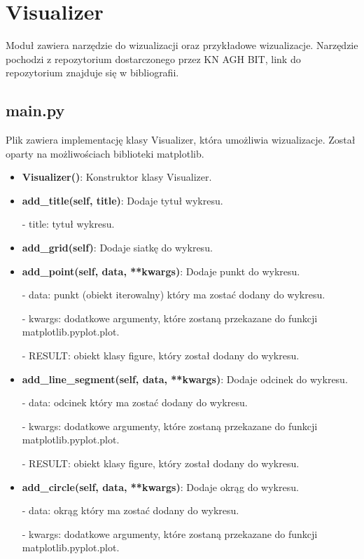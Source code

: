 \documentclass{lab}
\begin{document}
\section{Visualizer}
Moduł zawiera narzędzie do wizualizacji oraz przykładowe wizualizacje.
Narzędzie pochodzi z repozytorium dostarczonego przez KN AGH BIT, link do repozytorium znajduje się w bibliografii.
\subsection{main.py}
Plik zawiera implementację klasy Visualizer, która umożliwia wizualizacje. Został oparty na możliwościach biblioteki matplotlib.
\begin{itemize}
  \item \textbf{Visualizer()}:
  Konstruktor klasy Visualizer.

  \item \textbf{add\_title(self, title)}:
  Dodaje tytuł wykresu.

  - title: tytuł wykresu.

  \item \textbf{add\_grid(self)}:
  Dodaje siatkę do wykresu.

  \item \textbf{add\_point(self, data, **kwargs)}:
  Dodaje punkt do wykresu.

  - data: punkt (obiekt iterowalny) który ma zostać dodany do wykresu.

  - kwargs: dodatkowe argumenty, które zostaną przekazane do funkcji matplotlib.pyplot.plot.

  - RESULT: obiekt klasy figure, który został dodany do wykresu.

  \item \textbf{add\_line\_segment(self, data, **kwargs)}:
  Dodaje odcinek do wykresu.

  - data: odcinek który ma zostać dodany do wykresu.

  - kwargs: dodatkowe argumenty, które zostaną przekazane do funkcji matplotlib.pyplot.plot.

  - RESULT: obiekt klasy figure, który został dodany do wykresu.

  \item \textbf{add\_circle(self, data, **kwargs)}:
  Dodaje okrąg do wykresu.

  - data: okrąg który ma zostać dodany do wykresu.

  - kwargs: dodatkowe argumenty, które zostaną przekazane do funkcji matplotlib.pyplot.plot.


\end{itemize}
\end{document}
